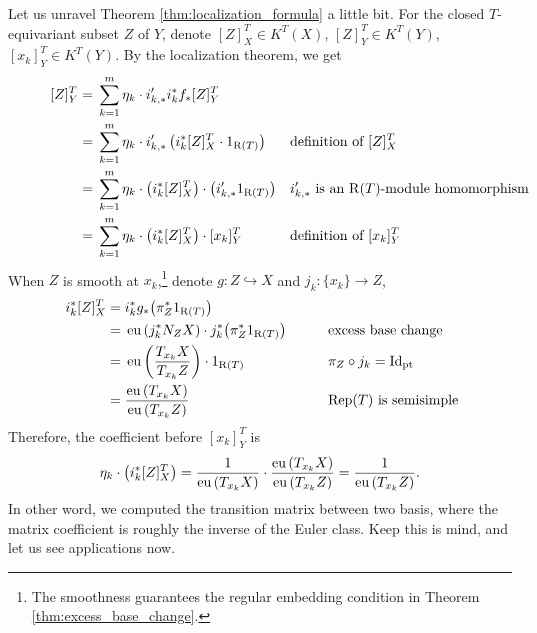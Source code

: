 Let us unravel Theorem \ref{thm:localization_formula} a little bit. For the closed $T$-equivariant subset $Z$ of $Y$, denote $[Z]_X^T \in K^T(X)$, $[Z]_Y^T \in K^T(Y)$, $[x_k]_Y^T \in K^T(Y)$. By the localization theorem, we get
\begin{equation*}
\begin{aligned}\
   [Z]_Y^T=\;& \sum_{k=1}^{m} \eta_k \cdot i'_{k,*}i_{k}^* f_{*} [Z]_Y^T&& \\
   =\;& \sum_{k=1}^{m} \eta_k \cdot i'_{k,*}\left(i_{k}^* [Z]_X^T \cdot 1_{\Rpt(T)}\right) && \text{definition of $[Z]_X^T$}\\
   =\;& \sum_{k=1}^{m} \eta_k \cdot \left(i_{k}^* [Z]_X^T\right) \cdot\left( i'_{k,*} 1_{\Rpt(T)}\right) && \text{$i'_{k,*}$ is an $\Rpt(T)$-module homomorphism}\hspace{-14mm}\\
   =\;& \sum_{k=1}^{m} \eta_k \cdot \left(i_{k}^* [Z]_X^T\right) \cdot[x_k]_Y^T && \text{definition of $[x_k]_Y^T$}\\
\end{aligned}
\end{equation*}
When $Z$ is smooth at $x_k$,\footnote{The smoothness guarantees the regular embedding condition in Theorem \ref{thm:excess_base_change}.} denote $g: Z \hookrightarrow X$ and $j_k: \{x_k\} \longrightarrow Z$, 
\begin{equation*}
\begin{aligned}\
   i_{k}^* [Z]_X^T=\;& i_{k}^* g_* \big(  \pi_Z^* 1_{\operatorname{\operatorname{R}}(T)} \big) &&\\
   =\;& \operatorname{\operatorname{eu}} \left( j_k^* N_Z X  \right) \cdot j_k^* \big(  \pi_Z^* 1_{\operatorname{\operatorname{R}}(T)} \big) \qquad&& \text{excess base change}\\
   =\;& \operatorname{\operatorname{eu}} \left( \frac{T_{x_k}X}{T_{x_k}Z}  \right) \cdot  1_{\operatorname{\operatorname{R}}(T)}&& \pi_Z \circ j_k = \operatorname{\operatorname{Id}}_{\operatorname{\operatorname{pt}}} \\
   =\;& \frac{\operatorname{\operatorname{eu}} \left(T_{x_k}X\right)}{\operatorname{\operatorname{eu}} \left(T_{x_k}Z\right)} && \text{$\operatorname{\operatorname{Rep}}(T)$ is semisimple} \\
\end{aligned}
\end{equation*}
Therefore, the coefficient before $[x_k]_Y^T$ is 
$$\eta_k \cdot \left(i_{k}^* [Z]_X^T\right) = \frac{1}{\operatorname{\operatorname{eu}} \left(T_{x_k}X\right)}\cdot\frac{\operatorname{\operatorname{eu}} \left(T_{x_k}X\right)}{\operatorname{\operatorname{eu}} \left(T_{x_k}Z\right)}=\frac{1}{\operatorname{\operatorname{eu}} \left(T_{x_k}Z\right)}.$$
In other word, we computed the transition matrix between two basis, where the matrix coefficient is roughly the inverse of the Euler class. Keep this is mind, and let us see applications now.

